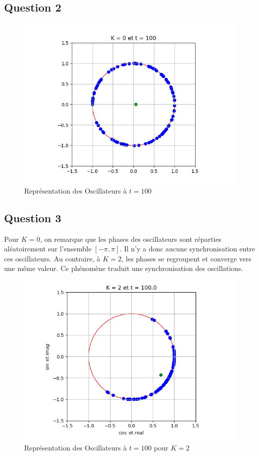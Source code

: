 \documentclass[a4paper, 11pt]{article}
\begin{document}
\subsection*{Question 2}
\begin{figure}[H]
    \centering
    \includegraphics[width=0.49\linewidth]{pics/kura2_100.jpg}
    \caption{Représentation des Oscillateurs à $t=100$}
\end{figure}

\subsection*{Question 3}
Pour $K=0$, on remarque que les phases des oscillateurs sont réparties aléatoirement sur l'ensemble $[-\pi, \pi]$. Il n'y a donc aucune synchronisation entre ces oscillateurs. Au contraire, à $K=2$, les phases se regroupent et converge vers une même valeur. Ce phénomène traduit une synchronisation des oscillations.
\begin{figure}[H]
    \centering
    \includegraphics[width=0.49\linewidth]{pics/kura3_100.jpg}
    \caption{Représentation des Oscillateurs à $t=100$ pour $K=2$}
\end{figure}
\end{document}
